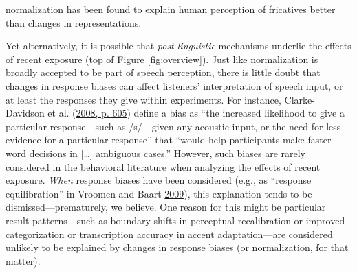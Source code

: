 \documentclass[
  11pt,
  english,
  man,floatsintext]{apa6}
\begin{document}
normalization has been found to explain human perception of fricatives better than changes in representations.

Yet alternatively, it is possible that \emph{post-linguistic} mechanisms underlie the effects of recent exposure (top of Figure \ref{fig:overview}). Just like normalization is broadly accepted to be part of speech perception, there is little doubt that changes in response biases can affect listeners' interpretation of speech input, or at least the responses they give within experiments. For instance, Clarke-Davidson et al. (\protect\hyperlink{ref-clarkedavidson2008}{2008, p. 605}) define a bias as ``the increased likelihood to give a particular response---such as /s/---given any acoustic input, or the need for less evidence for a particular response'' that ``would help participants make faster word decisions in {[}\ldots{]} ambiguous cases.'' However, such biases are rarely considered in the behavioral literature when analyzing the effects of recent exposure. \emph{When} response biases have been considered (e.g., as {``response equilibration''} in Vroomen and Baart \protect\hyperlink{ref-vroomen-baart2009}{2009}), this explanation tends to be dismissed---prematurely, we believe. One reason for this might be particular result patterns---such as boundary shifts in perceptual recalibration or improved categorization or transcription accuracy in accent adaptation---are considered unlikely to be explained by changes in response biases (or normalization, for that matter).
\end{document}

